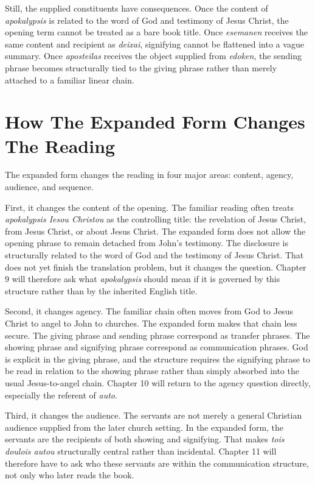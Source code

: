 Still, the supplied constituents have consequences. Once the content of \textit{apokalypsis} is related to the word of God and testimony of Jesus Christ, the opening term cannot be treated as a bare book title. Once \textit{esemanen} receives the same content and recipient as \textit{deixai}, signifying cannot be flattened into a vague summary. Once \textit{aposteilas} receives the object supplied from \textit{edoken}, the sending phrase becomes structurally tied to the giving phrase rather than merely attached to a familiar linear chain.

\section{How The Expanded Form Changes The Reading}

The expanded form changes the reading in four major areas: content, agency, audience, and sequence.

First, it changes the content of the opening. The familiar reading often treats \textit{apokalypsis Iesou Christou} as the controlling title: the revelation of Jesus Christ, from Jesus Christ, or about Jesus Christ. The expanded form does not allow the opening phrase to remain detached from John's testimony. The disclosure is structurally related to the word of God and the testimony of Jesus Christ. That does not yet finish the translation problem, but it changes the question. Chapter 9 will therefore ask what \textit{apokalypsis} should mean if it is governed by this structure rather than by the inherited English title.

Second, it changes agency. The familiar chain often moves from God to Jesus Christ to angel to John to churches. The expanded form makes that chain less secure. The giving phrase and sending phrase correspond as transfer phrases. The showing phrase and signifying phrase correspond as communication phrases. God is explicit in the giving phrase, and the structure requires the signifying phrase to be read in relation to the showing phrase rather than simply absorbed into the usual Jesus-to-angel chain. Chapter 10 will return to the agency question directly, especially the referent of \textit{auto}.

Third, it changes the audience. The servants are not merely a general Christian audience supplied from the later church setting. In the expanded form, the servants are the recipients of both showing and signifying. That makes \textit{tois doulois autou} structurally central rather than incidental. Chapter 11 will therefore have to ask who these servants are within the communication structure, not only who later reads the book.

